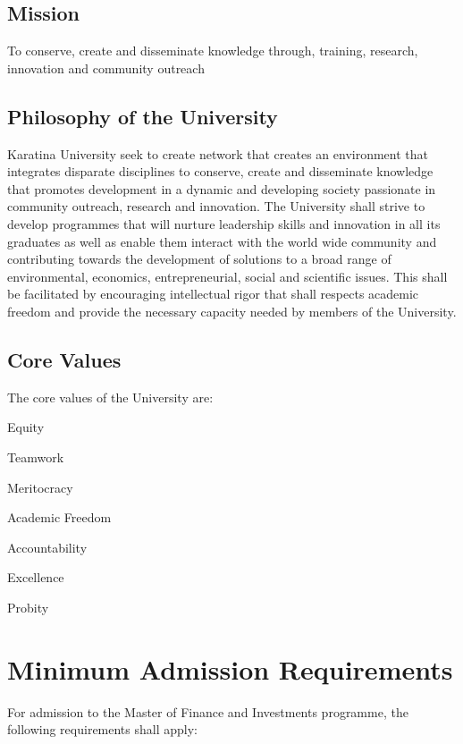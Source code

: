 \documentclass[16,a4paperpaper,]{article}
\begin{document}
\subsection{Mission}

To conserve, create and disseminate knowledge through, training,
research, innovation and community outreach

\subsection{Philosophy of the University}

Karatina University seek to create network that creates an environment
that integrates disparate disciplines to conserve, create and
disseminate knowledge that promotes development in a dynamic and
developing society passionate in community outreach, research and
innovation. The University shall strive to develop programmes that will
nurture leadership skills and innovation in all its graduates as well as
enable them interact with the world wide community and contributing
towards the development of solutions to a broad range of environmental,
economics, entrepreneurial, social and scientific issues. This shall be
facilitated by encouraging intellectual rigor that shall respects
academic freedom and provide the necessary capacity needed by members of
the University.

\subsection{Core Values}

The core values of the University are:

\begin{center}

Equity

Teamwork

Meritocracy

Academic Freedom

Accountability

Excellence

Probity

\end{center}

\section{Minimum Admission Requirements}

For admission to the Master of Finance and Investments programme, the
following requirements shall apply:
\end{document}
